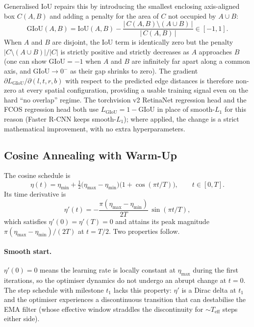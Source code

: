 \documentclass[11pt,a4paper]{article}
\begin{document}
Generalised IoU repairs this by introducing the smallest enclosing axis-aligned box $C(A, B)$ and adding a penalty for the area of $C$ not occupied by $A \cup B$:
\begin{equation}
\mathrm{GIoU}(A, B) = \mathrm{IoU}(A, B) - \frac{\bigl|\,C(A, B) \setminus (A \cup B)\,\bigr|}{\bigl|\,C(A, B)\,\bigr|} \in [-1, 1].
\end{equation}
When $A$ and $B$ are disjoint, the IoU term is identically zero but the penalty $|C \setminus (A \cup B)|/|C|$ is strictly positive and strictly decreases as $A$ approaches $B$ (one can show $\mathrm{GIoU} = -1$ when $A$ and $B$ are infinitely far apart along a common axis, and $\mathrm{GIoU} \to 0^-$ as their gap shrinks to zero). The gradient $\partial L_{\mathrm{GIoU}} / \partial (l, t, r, b)$ with respect to the predicted edge distances is therefore non-zero at every spatial configuration, providing a usable training signal even on the hard ``no overlap'' regime. The torchvision v2 RetinaNet regression head and the FCOS regression head both use $L_{\mathrm{GIoU}} = 1 - \mathrm{GIoU}$ in place of smooth-$L_1$ for this reason (Faster R-CNN keeps smooth-$L_1$); where applied, the change is a strict mathematical improvement, with no extra hyperparameters.

\subsection{Cosine Annealing with Warm-Up}
\label{sec:numerical-cosine}

The cosine schedule is
\begin{equation}
\eta(t) = \eta_{\min} + \tfrac{1}{2}\bigl(\eta_{\max} - \eta_{\min}\bigr)\bigl(1 + \cos(\pi t / T)\bigr), \qquad t \in [0, T].
\end{equation}
Its time derivative is
\begin{equation}
\eta'(t) = -\frac{\pi(\eta_{\max} - \eta_{\min})}{2T}\,\sin(\pi t / T),
\end{equation}
which satisfies $\eta'(0) = \eta'(T) = 0$ and attains its peak magnitude $\pi(\eta_{\max} - \eta_{\min})/(2T)$ at $t = T/2$. Two properties follow.

\paragraph{Smooth start.} $\eta'(0) = 0$ means the learning rate is locally constant at $\eta_{\max}$ during the first iterations, so the optimiser dynamics do not undergo an abrupt change at $t = 0$. The step schedule with milestone $t_1$ lacks this property: $\eta'$ is a Dirac delta at $t_1$ and the optimiser experiences a discontinuous transition that can destabilise the EMA filter (whose effective window straddles the discontinuity for $\sim T_{\mathrm{eff}}$ steps either side).
\end{document}
